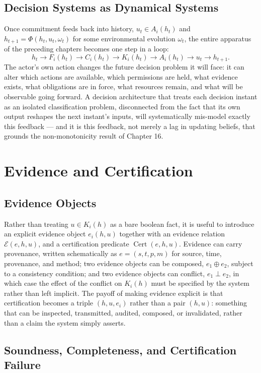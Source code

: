 \documentclass[11pt]{report}
\theoremstyle{definition}
\theoremstyle{plain}
\begin{document}
\chapter{Decision Systems as Dynamical Systems}

Once commitment feeds back into history, $u_t \in A_i(h_t)$ and $h_{t+1} = \Phi(h_t, u_t, \omega_t)$ for some environmental evolution $\omega_t$, the entire apparatus of the preceding chapters becomes one step in a loop:
\[
h_t \to F_i(h_t) \to C_i(h_t) \to K_i(h_t) \to A_i(h_t) \to u_t \to h_{t+1}.
\]
The actor's own action changes the future decision problem it will face: it can alter which actions are available, which permissions are held, what evidence exists, what obligations are in force, what resources remain, and what will be observable going forward. A decision architecture that treats each decision instant as an isolated classification problem, disconnected from the fact that its own output reshapes the next instant's inputs, will systematically mis-model exactly this feedback --- and it is this feedback, not merely a lag in updating beliefs, that grounds the non-monotonicity result of Chapter 16.

\part{Evidence and Certification}

\chapter{Evidence Objects}

Rather than treating $u \in K_i(h)$ as a bare boolean fact, it is useful to introduce an explicit evidence object $e_i(h,u)$ together with an evidence relation $\mathcal{E}(e,h,u)$, and a certification predicate $\operatorname{Cert}(e,h,u)$. Evidence can carry provenance, written schematically as $e = (s,t,p,m)$ for source, time, provenance, and method; two evidence objects can be composed, $e_1 \oplus e_2$, subject to a consistency condition; and two evidence objects can conflict, $e_1 \perp e_2$, in which case the effect of the conflict on $K_i(h)$ must be specified by the system rather than left implicit. The payoff of making evidence explicit is that certification becomes a triple $(h,u,e_i)$ rather than a pair $(h,u)$: something that can be inspected, transmitted, audited, composed, or invalidated, rather than a claim the system simply asserts.

\chapter{Soundness, Completeness, and Certification Failure}
\end{document}
